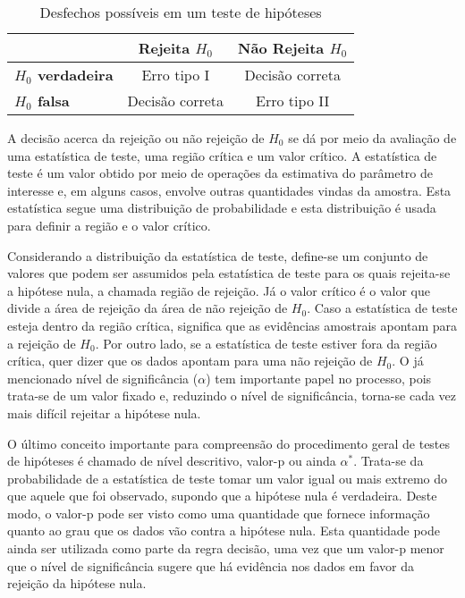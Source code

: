 \begin{table}[h]
\centering
\begin{tabular}{l|cc}
\hline
\multicolumn{1}{c|}{}    & \textbf{Rejeita $H_0$} & \textbf{Não Rejeita $H_0$} \\ \hline
\textbf{$H_0$ verdadeira} & Erro tipo I           & Decisão correta           \\
\textbf{$H_0$ falsa}      & Decisão correta       & Erro tipo II              \\ \hline
\end{tabular}
\caption{Desfechos possíveis em um teste de hipóteses}
\label{tab:desfechos}
\end{table}

A decisão acerca da rejeição ou não rejeição de $H_0$ se dá por meio da avaliação de uma estatística de teste, uma região crítica e um valor crítico. A estatística de teste é um valor obtido por meio de operações da estimativa do parâmetro de interesse e, em alguns casos, envolve outras quantidades vindas da amostra. Esta estatística segue uma distribuição de probabilidade e esta distribuição é usada para definir a região e o valor crítico.

Considerando a distribuição da estatística de teste, define-se um conjunto de valores que podem ser assumidos pela estatística de teste para os quais rejeita-se a hipótese nula, a chamada região de rejeição. Já o valor crítico é o valor que divide a área de rejeição da área de não rejeição de $H_0$. Caso a estatística de teste esteja dentro da região crítica, significa que as evidências amostrais apontam para a rejeição de $H_0$. Por outro lado, se a estatística de teste estiver fora da região crítica, quer dizer que os dados apontam para uma não rejeição de $H_0$. O já mencionado nível de significância ($\alpha$) tem importante papel no processo, pois trata-se de um valor fixado e, reduzindo o nível de significância, torna-se cada vez mais difícil rejeitar a hipótese nula.

O último conceito importante para compreensão do procedimento geral de  testes de hipóteses é chamado de nível descritivo, valor-p ou ainda $\alpha^*$. Trata-se da probabilidade de a estatística de teste tomar um valor igual ou mais extremo do que aquele que foi observado, supondo que a hipótese nula é verdadeira. Deste modo, o valor-p pode ser visto como uma quantidade que fornece informação quanto ao grau que os dados vão contra a hipótese nula. Esta quantidade pode ainda ser utilizada como parte da regra decisão, uma vez que um valor-p menor que o nível de significância sugere que há evidência nos dados em favor da rejeição da hipótese nula.

